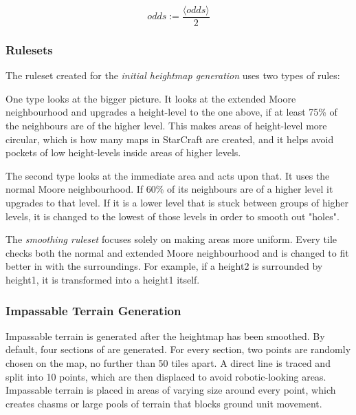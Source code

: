 \begin{equation}
	odds := \frac{\langle odds\rangle}{2}
\end{equation}

\subsubsection{Rulesets}
\label{methodology_ca_our_rulesets}

The ruleset created for the \textit{initial heightmap generation} uses two types of rules:

One type looks at the bigger picture. It looks at the extended Moore neighbourhood and upgrades a height-level to the one above, if at least 75\% of the neighbours are of the higher level. This makes areas of height-level more circular, which is how many maps in StarCraft are created, and it helps avoid pockets of low height-levels inside areas of higher levels.

The second type looks at the immediate area and acts upon that. It uses the normal Moore neighbourhood. If 60\% of its neighbours are of a higher level it upgrades to that level. If it is a lower level that is stuck between groups of higher levels, it is changed to the lowest of those levels in order to smooth out "holes".

The \textit{smoothing ruleset} focuses solely on making areas more uniform. Every tile checks both the normal and extended Moore neighbourhood and is changed to fit better in with the surroundings. For example, if a height2 is surrounded by height1, it is transformed into a height1 itself.

\subsubsection{Impassable Terrain Generation}
\label{methodology_ca_our_impassable}

Impassable terrain is generated after the heightmap has been smoothed. By default, four sections of are generated. For every section, two points are randomly chosen on the map, no further than 50 tiles apart. A direct line is traced and split into 10 points, which are then displaced to avoid robotic-looking areas. Impassable terrain is placed in areas of varying size around every point, which creates chasms or large pools of terrain that blocks ground unit movement.
